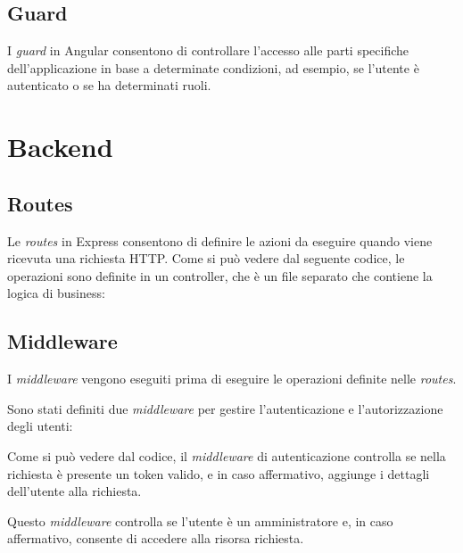 

\subsection{Guard}

I \textit{guard} in Angular consentono di controllare l'accesso alle parti specifiche dell'applicazione in base a determinate condizioni, ad esempio, se l'utente è autenticato o se ha determinati ruoli.



\section{Backend}

\subsection{Routes}
Le \textit{routes} in Express consentono di definire le azioni da eseguire quando viene ricevuta una richiesta HTTP.
Come si può vedere dal seguente codice, le operazioni sono definite in un controller, che è un file separato che contiene la logica di business:


\subsection{Middleware}
I \textit{middleware} vengono eseguiti prima di eseguire le operazioni definite nelle \textit{routes}.

Sono stati definiti due \textit{middleware} per gestire l'autenticazione e l'autorizzazione degli utenti:



Come si può vedere dal codice, il \textit{middleware} di autenticazione controlla se nella richiesta è presente un token valido, e in caso affermativo, aggiunge i dettagli dell'utente alla richiesta.



Questo \textit{middleware} controlla se l'utente è un amministratore e, in caso affermativo, consente di accedere alla risorsa richiesta.
